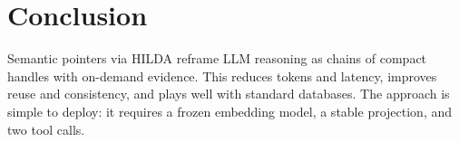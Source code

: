 \documentclass[11pt]{article}
\newcommand{\hilda}{\textsc{HILDA}}
\newcommand{\llm}{\textsc{LLM}}
\begin{document}
\section{Conclusion}
Semantic pointers via \hilda{} reframe \llm{} reasoning as chains of compact handles with on-demand evidence. This reduces tokens and latency, improves reuse and consistency, and plays well with standard databases. The approach is simple to deploy: it requires a frozen embedding model, a stable projection, and two tool calls.
\end{document}
